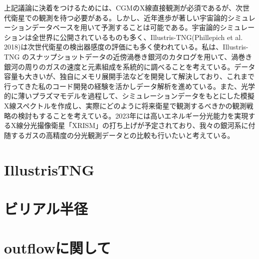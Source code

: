 上記議論に決着をつけるためには、CGMのX線直接観測が必須であるが、次世代衛星での観測を待つ必要がある。しかし、近年進歩が著しい宇宙論的シミュレーションデータベースを用いて予測することは可能である。宇宙論的シミュレーションは全世界に公開されているものも多く、Illustris-TNG(Phillepich et al. 2018)は次世代衛星の検出器感度の評価にも多く使われている。私は、Illustris-TNG のスナップショットデータの近傍渦巻き銀河のカタログを用いて、渦巻き銀河の周りのガスの速度と元素組成を系統的に調べることを考えている。データ容量も大きいが、独自にメモリ展開手法などを開発して解決しており、これまで行ってきた私のコード開発の経験を活かしデータ解析を進めている。また、光学的に薄いプラズマモデルを過程して、シミュレーションデータをもとにした模擬X線スペクトルを作成し、実際にどのように将来衛星で観測するべきかの観測戦略の検討もすることを考えている。2023年には高いエネルギー分光能力を実現するX線分光撮像衛星「XRISM」の打ち上げが予定されており、我々の銀河系に付随するガスの高精度の分光観測データとの比較も行いたいと考えている。

\section{IllustrisTNG}

\section{ビリアル半径}

\section{outflowに関して}